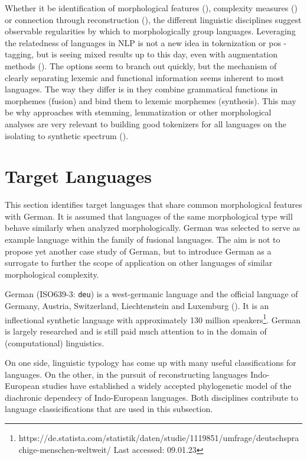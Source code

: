Whether it be identification of morphological features (\cite[42--56]{comrie1989}), complexity measures (\cite{measuresofMC}) or connection through reconstruction (\cite{INDOEUROPE}),
the different linguistic disciplines suggest observable regularities by which to morphologically group languages.
Leveraging the relatedness of languages in NLP is not a new idea in tokenization or \ac{pos} \hyphen tagging, but is seeing mixed results up to this day, even with augmentation methods (\cite{mixednoiseinterlanguage}).
The options seem to branch out quickly, but the mechanism of clearly separating lexemic and functional information seems inherent to most languages.
The way they differ is in they combine grammatical functions in morphemes (fusion) and bind them to lexemic morphemes (synthesis).
This may be why approaches with stemming, lemmatization or other morphological analyses are very relevant to building good tokenizers for all languages on the isolating to synthetic spectrum (\cite[51--53]{POLYSYNTHLM}).


\section{Target Languages}
\label{sec:target-languages}
This section identifies target languages that share common morphological features with German.
It is assumed that languages of the same morphological type will behave similarly when analyzed morphologically.
German was selected to serve as example language within the family of fusional languages.
The aim is not to propose yet another case study of German, but to introduce German as a surrogate to further the scope of application on other languages of similar morphological complexity.

German (ISO639-3: \texttt{deu}) is a west-germanic language and the official language of Germany, Austria, Switzerland, Liechtenstein and Luxemburg (\cite{METZLER2016}).
It is an inflectional synthetic language with approximately 130 million speakers\footnote{https://de.statista.com/statistik/daten/studie/1119851/umfrage/deutschsprachige-menschen-weltweit/ Last accessed: 09.01.23}.
German is largely researched and is still paid much attention to in the domain of (computational) linguistics.


On one side, linguistic typology has come up with many useful classifications for languages.
On the other, in the pursuit of reconstructing languages Indo-European studies have established a widely accepted phylogenetic model of the diachronic dependecy of Indo-European languages.
Both disciplines contribute to language classicifications that are used in this subsection.

